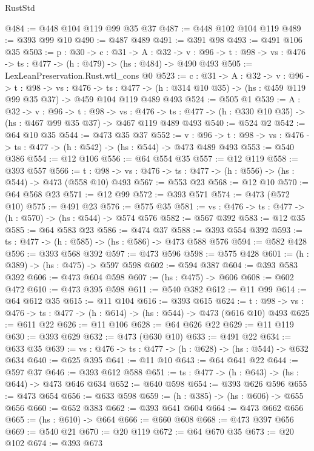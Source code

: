 \begin{lexlean}{RustStd}
\begin{coremodule}
@484 := @448 @104 @119 @99 @35 @37
@487 := @448 @102 @104 @119
@489 := @393 @99 @10
@490 := @487 @489
@491 := @391 @98
@493 := @491 @106 @35
@503 := {p : @30} ->
  {c : @31} ->
  {A : @32} ->
  {v : @96} -> {t : @98} -> {vs : @476} -> {ts : @477} -> (h : @479) -> (hs : @484) -> @490 @493
@505 := LexLeanPreservation.Rust.wtl_cons @0
@523 := {c : @31} ->
  {A : @32} ->
  {v : @96} ->
  {t : @98} ->
  {vs : @476} ->
  {ts : @477} -> (h : @314 @10 @35) -> (hs : @459 @119 @99 @35 @37) -> @459 @104 @119 @489 @493
@524 := @505 @1
@539 := {A : @32} ->
  {v : @96} ->
  {t : @98} ->
  {vs : @476} -> {ts : @477} -> (h : @330 @10 @35) -> (hs : @467 @99 @35 @37) -> @467 @119 @489 @493
@540 := @524 @2
@542 := @64 @10 @35
@544 := @473 @35 @37
@552 := {v : @96} ->
  {t : @98} -> {vs : @476} -> {ts : @477} -> (h : @542) -> (hs : @544) -> @473 @489 @493
@553 := @540 @386
@554 := @12 @106
@556 := @64 @554 @35
@557 := @12 @119
@558 := @393 @557
@566 := {t : @98} -> {vs : @476} -> {ts : @477} -> (h : @556) -> (hs : @544) -> @473 (@558 @10) @493
@567 := @553 @23
@568 := @12 @10
@570 := @64 @568 @23
@571 := @12 @99
@572 := @393 @571
@574 := @473 (@572 @10)
@575 := @491 @23
@576 := @575 @35
@581 := {vs : @476} -> {ts : @477} -> (h : @570) -> (hs : @544) -> @574 @576
@582 := @567 @392
@583 := @12 @35
@585 := @64 @583 @23
@586 := @474 @37
@588 := @393 @554 @392
@593 := {ts : @477} -> (h : @585) -> (hs : @586) -> @473 @588 @576
@594 := @582 @428
@596 := @393 @568 @392
@597 := @473 @596
@598 := @575 @428
@601 := (h : @389) -> (hs : @475) -> @597 @598
@602 := @594 @387
@604 := @393 @583 @392
@606 := @473 @604 @598
@607 := (hs : @475) -> @606
@608 := @602 @472
@610 := @473 @395 @598
@611 := @540 @382
@612 := @11 @99
@614 := @64 @612 @35
@615 := @11 @104
@616 := @393 @615
@624 := {t : @98} -> {vs : @476} -> {ts : @477} -> (h : @614) -> (hs : @544) -> @473 (@616 @10) @493
@625 := @611 @22
@626 := @11 @106
@628 := @64 @626 @22
@629 := @11 @119
@630 := @393 @629
@632 := @473 (@630 @10)
@633 := @491 @22
@634 := @633 @35
@639 := {vs : @476} -> {ts : @477} -> (h : @628) -> (hs : @544) -> @632 @634
@640 := @625 @395
@641 := @11 @10
@643 := @64 @641 @22
@644 := @597 @37
@646 := @393 @612 @588
@651 := {ts : @477} -> (h : @643) -> (hs : @644) -> @473 @646 @634
@652 := @640 @598
@654 := @393 @626 @596
@655 := @473 @654
@656 := @633 @598
@659 := (h : @385) -> (hs : @606) -> @655 @656
@660 := @652 @383
@662 := @393 @641 @604
@664 := @473 @662 @656
@665 := (hs : @610) -> @664
@666 := @660 @608
@668 := @473 @397 @656
@669 := @540 @21
@670 := @20 @119
@672 := @64 @670 @35
@673 := @20 @102
@674 := @393 @673

\end{coremodule}
\end{lexlean}
